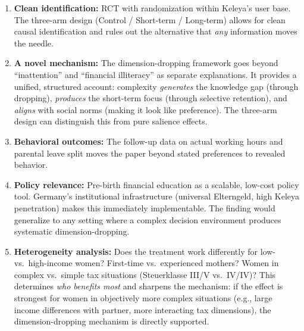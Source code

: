 \documentclass[12pt,a4paper]{article}
\begin{document}
\begin{enumerate}
    \item \textbf{Clean identification:} RCT with randomization within Keleya's user base. The three-arm design (Control / Short-term / Long-term) allows for clean causal identification and rules out the alternative that \emph{any} information moves the needle.

    \item \textbf{A novel mechanism:} The dimension-dropping framework goes beyond ``inattention'' and ``financial illiteracy'' as separate explanations. It provides a unified, structured account: complexity \emph{generates} the knowledge gap (through dropping), \emph{produces} the short-term focus (through selective retention), and \emph{aligns} with social norms (making it look like preference). The three-arm design can distinguish this from pure salience effects.

    \item \textbf{Behavioral outcomes:} The follow-up data on actual working hours and parental leave split moves the paper beyond stated preferences to revealed behavior.

    \item \textbf{Policy relevance:} Pre-birth financial education as a scalable, low-cost policy tool. Germany's institutional infrastructure (universal Elterngeld, high Keleya penetration) makes this immediately implementable. The finding would generalize to any setting where a complex decision environment produces systematic dimension-dropping.

    \item \textbf{Heterogeneity analysis:} Does the treatment work differently for low- vs.\ high-income women? First-time vs.\ experienced mothers? Women in complex vs.\ simple tax situations (Steuerklasse III/V vs.\ IV/IV)? This determines \emph{who benefits most} and sharpens the mechanism: if the effect is strongest for women in objectively more complex situations (e.g., large income differences with partner, more interacting tax dimensions), the dimension-dropping mechanism is directly supported.


\end{enumerate}
\end{document}
